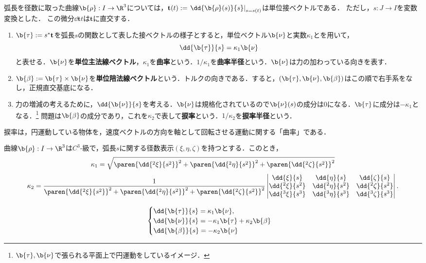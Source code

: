 \documentclass[uplatex,dvipdfmx]{jsreport}
\begin{document}
\begin{definition}[曲線の基本量]
    弧長を径数に取った曲線$\b{\rho}:I\to\R^3$については，$\mathbf{t}(t):=\left.\dd{\b{\rho}(s)}{s}\right|_{s=s(t)}$は単位接ベクトルである．
    ただし，$s:J\to I$を変数変換とした．
    この微分$\dd{\mathbf{t}}{t}$は$\mathbf{t}$に直交する．
    \begin{enumerate}
        \item $\b{\tau}:=s^*\mathbf{t}$を弧長$s$の関数として表した接ベクトルの様子とすると，単位ベクトル$\b{\nu}$と実数$\kappa_1$とを用いて，
        \[\dd{\b{\tau}}{s}=\kappa_1\b{\nu}\]
        と表せる．$\b{\nu}$を\textbf{単位主法線ベクトル}，$\kappa_1$を\textbf{曲率}という．$1/\kappa_1$を\textbf{曲率半径}という．$\b{\nu}$は力の加わっている向きを表す．
        \item $\b{\beta}:=\b{\tau}\times\b{\nu}$を\textbf{単位陪法線ベクトル}という．トルクの向きである．すると，$(\b{\tau},\b{\nu},\b{\beta})$はこの順で右手系をなし，正規直交基底になる．
        \item 力の増減の考えるために，$\dd{\b{\nu}}{s}$を考える．$\b{\nu}$は規格化されているので$\b{\nu}(s)$の成分は$0$になる．$\b{\tau}$に成分は$-\kappa_1$となる．\footnote{$\b{\tau},\b{\nu}$で張られる平面上で円運動をしているイメージ．}
        問題は$\b{\beta}$の成分であり，これを$\kappa_2$で表して\textbf{捩率}という．$1/\kappa_2$を\textbf{捩率半径}という．
    \end{enumerate}
\end{definition}
\begin{remarks}
    捩率は，円運動している物体を，速度ベクトルの方向を軸として回転させる運動に関する「曲率」である．
\end{remarks}

\begin{proposition}[曲率と捩率の表示]
    曲線$\b{\rho}:I\to\R^3$は$C^3$-級で，弧長$s$に関する径数表示$(\xi,\eta,\zeta)$を持つとする．このとき，
    \[\kappa_1=\sqrt{\paren{\dd{^2\xi}{s^2}}^2+\paren{\dd{^2\eta}{s^2}}^2+\paren{\dd{^2\zeta}{s^2}}^2}\]
    \[\kappa_2=\frac{1}{\paren{\dd{^2\xi}{s^2}}^2+\paren{\dd{^2\eta}{s^2}}^2+\paren{\dd{^2\zeta}{s^2}}^2}\begin{vmatrix}\dd{\xi}{s}&\dd{\eta}{s}&\dd{\zeta}{s}\\\dd{^2\xi}{s^2}&\dd{^2\eta}{s^2}&\dd{^2\zeta}{s^2}\\\dd{^3\xi}{s^3}&\dd{^3\eta}{s^3}&\dd{^3\zeta}{s^3}\end{vmatrix}.\]
\end{proposition}

\begin{theorem}
    \[\begin{cases}
        \dd{\b{\tau}}{s}=\kappa_1\b{\nu},\\
        \dd{\b{\nu}}{s}=-\kappa_1\b{\tau}+\kappa_2\b{\beta}\\
        \dd{\b{\beta}}{s}=-\kappa_2\b{\nu}
    \end{cases}\]
\end{theorem}
\end{document}
